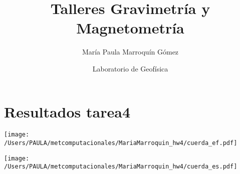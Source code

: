 \documentclass[11pt,a4paper]{article}
\author{María Paula Marroquín Gómez}
\title{Talleres Gravimetría y Magnetometría}
\date{Laboratorio de Geofísica}
\begin{document}
\maketitle
\section{Resultados tarea4}
\begin{center}
\texttt{[image: /Users/PAULA/metcomputacionales/MariaMarroquin\_hw4/cuerda\_ef.pdf]}
\end{center}
\begin{center}
\texttt{[image: /Users/PAULA/metcomputacionales/MariaMarroquin\_hw4/cuerda\_es.pdf]}
\end{center}
\end{document}
